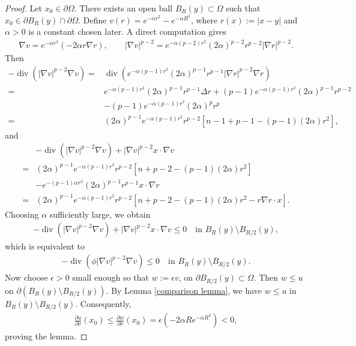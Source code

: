 \documentclass[11pt,leqno]{amsart}
\def\div{\operatorname{div}}
\numberwithin{equation}{section}
\begin{document}
\begin{proof}
Let $x_{0}\in \partial \Omega$. There exists an open ball $B_{R}(y)\subset \Omega$ such that $x_{0}\in \partial B_{R}(y)\cap \partial \Omega$.  Define $v(r)=e^{-\alpha r^{2}}-e^{-\alpha R^{2}}$, where $r(x):=|x-y|$ and $\alpha>0$ is a constant chosen later.
A direct computation gives
\begin{align*}
    \nabla v=e^{-\alpha r^{2}}(-2\alpha r\nabla r), \qquad |\nabla v|^{p-2}=e^{-\alpha (p-2)r^{2}}(2\alpha)^{p-2}r^{p-2}|\nabla r|^{p-2}.
\end{align*}
Then
\begin{align*}
    -\div(|\nabla v|^{p-2}\nabla v)
    =&\div(e^{-\alpha (p-1)r^{2}}(2\alpha)^{p-1}r^{p-1}|\nabla r|^{p-2}\nabla r)\nonumber\\
    = &e^{-\alpha (p-1)r^{2}}(2\alpha)^{p-1}r^{p-1}\Delta r+(p-1)e^{-\alpha (p-1)r^{2}}(2\alpha)^{p-1}r^{p-2}\\
    &-(p-1)e^{-\alpha (p-1)r^{2}}(2\alpha)^{p}r^{p}\nonumber\\
    =&(2\alpha)^{p-1}e^{-\alpha (p-1)r^{2}}r^{p-2}\left[n-1+p-1-(p-1)(2\alpha)r^{2}\right],
\end{align*}
and
\begin{align*}
    &-\div(|\nabla v|^{p-2}\nabla v)+|\nabla v|^{p-2}x\cdot \nabla v\\
    =&(2\alpha)^{p-1}e^{-\alpha (p-1)r^{2}}r^{p-2}\left[n+p-2-(p-1)(2\alpha)r^{2}\right]\nonumber\\
    &-e^{-(p-1)\alpha r^{2}}(2\alpha)^{p-1}r^{p-1}x\cdot \nabla r\\
    =&(2\alpha)^{p-1}e^{-\alpha (p-1)r^{2}}r^{p-2}\left[n+p-2-(p-1)(2\alpha)r^{2}-r\nabla r\cdot x\right].
\end{align*}
Choosing $\alpha$ sufficiently large, we obtain 
\begin{align*}
    -\div(|\nabla v|^{p-2}\nabla v)+|\nabla v|^{p-2}x\cdot \nabla v \leq 0  \quad \text{in  $B_{R}(y)\setminus B_{R/2}(y)$},
\end{align*}
which is equivalent to
\begin{align*}
    -\div(\phi |\nabla v|^{p-2}\nabla v)\leq 0 \quad \text{in  $B_{R}(y)\setminus B_{R/2}(y)$}.
\end{align*}
Now choose $\epsilon>0$ small enough so that $w:=\epsilon v$,  on $\partial B_{R/2}(y)\subset \Omega$.
Then $w\leq u$ on $ \partial (B_{R}(y)\setminus B_{R/2}(y))$. By Lemma \ref{comparison lemma}, we have $w \leq u$ in $B_{R}(y)\setminus B_{R/2}(y)$. Consequently,
\begin{align*}
    \frac{\partial u}{\partial \nu}(x_0)\leq \frac{\partial w}{\partial \nu}(x_0)=\epsilon(-2\alpha R e^{-\alpha R^{2}})<0,
\end{align*}
proving the lemma.
\end{proof}
\end{document}

